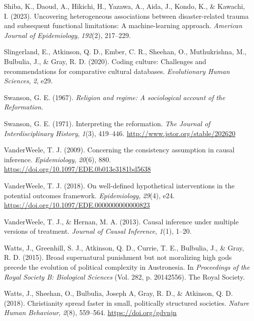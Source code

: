 \documentclass[
  single column]{article}
\newlength{\cslhangindent}
\newenvironment{CSLReferences}[2] %
 {\begin{list}{}{%
  \setlength{\itemindent}{0pt}
  \setlength{\leftmargin}{0pt}
  \setlength{\parsep}{0pt}
  \ifodd #1
   \setlength{\leftmargin}{\cslhangindent}
   \setlength{\itemindent}{-1\cslhangindent}
  \fi
  \setlength{\itemsep}{#2\baselineskip}}}
 {\end{list}}
\begin{document}
\begin{CSLReferences}{1}{0}
Shiba, K., Daoud, A., Hikichi, H., Yazawa, A., Aida, J., Kondo, K., \&
Kawachi, I. (2023). Uncovering heterogeneous associations between
disaster-related trauma and subsequent functional limitations: A
machine-learning approach. \emph{American Journal of Epidemiology},
\emph{192}(2), 217--229.

Slingerland, E., Atkinson, Q. D., Ember, C. R., Sheehan, O.,
Muthukrishna, M., Bulbulia, J., \& Gray, R. D. (2020). Coding culture:
Challenges and recommendations for comparative cultural databases.
\emph{Evolutionary Human Sciences}, \emph{2}, e29.

Swanson, G. E. (1967). \emph{Religion and regime: A sociological account
of the {R}eformation}.

Swanson, G. E. (1971). Interpreting the reformation. \emph{The Journal
of Interdisciplinary History}, \emph{1}(3), 419--446.
\url{http://www.jstor.org/stable/202620}

VanderWeele, T. J. (2009). Concerning the consistency assumption in
causal inference. \emph{Epidemiology}, \emph{20}(6), 880.
\url{https://doi.org/10.1097/EDE.0b013e3181bd5638}

VanderWeele, T. J. (2018). On well-defined hypothetical interventions in
the potential outcomes framework. \emph{Epidemiology}, \emph{29}(4),
e24. \url{https://doi.org/10.1097/EDE.0000000000000823}

VanderWeele, T. J., \& Hernan, M. A. (2013). Causal inference under
multiple versions of treatment. \emph{Journal of Causal Inference},
\emph{1}(1), 1--20.

Watts, J., Greenhill, S. J., Atkinson, Q. D., Currie, T. E., Bulbulia,
J., \& Gray, R. D. (2015). Broad supernatural punishment but not
moralizing high gods precede the evolution of political complexity in
{A}ustronesia. In \emph{Proceedings of the Royal Society B: Biological
Sciences} (Vol. 282, p. 20142556). The Royal Society.

Watts, J., Sheehan, O., Bulbulia, Joseph A, Gray, R. D., \& Atkinson, Q.
D. (2018). Christianity spread faster in small, politically structured
societies. \emph{Nature Human Behaviour}, \emph{2}(8), 559--564.
\url{https://doi.org/gdvnjn}


\end{CSLReferences}
\end{document}
